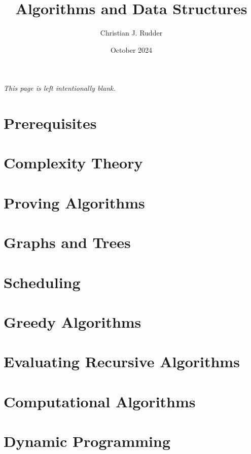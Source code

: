 \documentclass{memoir}
\title{Algorithms and Data Structures}
\author{Christian J. Rudder}
\date{October 2024}
\begin{document}
\maketitle
\setcounter{tocdepth}{2}

\tableofcontents

\newpage
\thispagestyle{empty}
\mbox{}
\vfill
\begin{center}
    \textit{This page is left intentionally blank.}
\end{center}
\vfill
\newpage



\chapter*{Prerequisites}


\chapter{Complexity Theory}

\chapter{Proving Algorithms}


\chapter{Graphs and Trees}




\chapter{Scheduling}




\chapter{Greedy Algorithms}



\chapter{Evaluating Recursive Algorithms}


\chapter{Computational Algorithms}




\chapter {Dynamic Programming}


\end{document}
